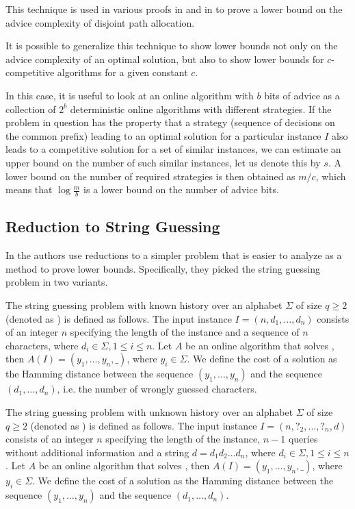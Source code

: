 This technique is used in various proofs in \cite{misof-trivial-graphs}
and in \cite{komm-thesis} to prove a lower bound on the advice complexity
of disjoint path allocation.

It is possible to generalize this technique to show lower bounds not only
on the advice complexity of an optimal solution, but also to show lower
bounds for $c$-competitive algorithms for a given constant $c$.

In this case, it is useful to look at an online algorithm with $b$ bits of
advice as a collection of $2^b$ deterministic online algorithms with
different strategies. If the problem in question has the property that a
strategy (sequence of decisions on the common prefix) leading to an
optimal solution for a particular instance $I$ also leads to a competitive
solution for a set of similar instances, we can estimate an upper bound on
the number of such similar instances, let us denote this by $s$. A lower
bound on the number of required strategies is then obtained as $m/c$,
which means that $\log\frac{m}{b}$ is a lower bound on the number of
advice bits.

\subsection{Reduction to String Guessing}

In \cite{string-guessing} the authors use reductions to a simpler problem
that is easier to analyze as a method to prove lower bounds. Specifically,
they picked the string guessing problem in two variants.

\begin{definition}
    The string guessing problem with known history over an alphabet
    $\Sigma$ of size $q \geq 2$ (denoted as ) is defined as
    follows. The input instance $I = (n, d_1, \dots, d_n)$ consists of an
    integer $n$ specifying the length of the instance and a sequence of
    $n$ characters, where $d_i \in \Sigma, 1 \leq i \leq n$. Let $A$ be an
    online algorithm that solves , then $A(I) = (y_1, \dots, y_n,
    \_)$, where $y_i \in \Sigma$. We define the cost of a solution as the
    Hamming distance between the sequence $(y_1, \dots, y_n)$ and the
    sequence $(d_1, \dots, d_n)$, i.e. the number of wrongly guessed
    characters.
\end{definition}

\begin{definition}
    The string guessing problem with unknown history over an alphabet
    $\Sigma$ of size $q \geq 2$ (denoted as ) is defined as
    follows. The input instance $I = (n, ?_2, \dots, ?_n, d)$ consists of
    an integer $n$ specifying the length of the instance, $n-1$ queries
    without additional information and a string $d = d_1d_2\dots{}d_n$,
    where $d_i \in \Sigma, 1 \leq i \leq n$. Let $A$ be an online
    algorithm that solves , then $A(I) = (y_1, \dots, y_n, \_)$,
    where $y_i \in \Sigma$. We define the cost of a solution as the
    Hamming distance between the sequence $(y_1, \dots, y_n)$ and the
    sequence $(d_1, \dots, d_n)$.
\end{definition}

